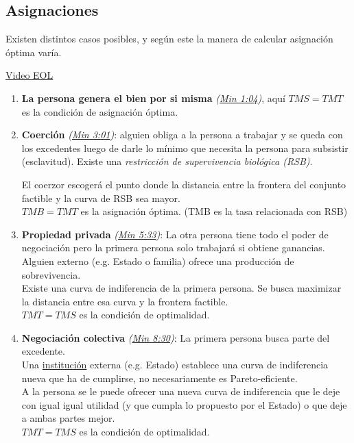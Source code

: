 \subsection{Asignaciones}
Existen distintos casos posibles, y según este la manera de calcular asignación óptima varía.


\href{https://www.youtube.com/watch?v=jWcbHlTCPnQ}{Video EOL}
\begin{enumerate}[label=\Roman*.]
    \item \textbf{La persona genera el bien por si misma} \textit{(\href{https://youtu.be/jWcbHlTCPnQ?t=64}{Min 1:04})}, aquí $TMS = TMT$ es la condición de asignación óptima. 
    
    \item \textbf{Coerción} \textit{(\href{https://youtu.be/jWcbHlTCPnQ?t=181}{Min 3:01})}: alguien obliga a la persona a trabajar y se queda con los excedentes luego de darle lo mínimo que necesita la persona para subsistir (esclavitud). Existe una \textit{restricción de supervivencia biológica (RSB)}.
    
    El coerzor escogerá el punto donde la distancia entre la frontera del conjunto factible y la curva de RSB sea mayor.\\
    
    $TMB = TMT$ es la asignación óptima. (TMB es la tasa relacionada con RSB)
    
    \item \textbf{Propiedad privada} \textit{(\href{https://youtu.be/jWcbHlTCPnQ?t=333}{Min 5:33})}: La otra persona tiene todo el poder de negociación pero la primera persona solo trabajará si obtiene ganancias. \\
    
    Alguien externo (e.g. Estado o familia) ofrece una producción de sobrevivencia.\\
    
    Existe una curva de indiferencia de la primera persona. Se busca maximizar la distancia entre esa curva y la frontera factible.\\
    
    $TMT = TMS$ es la condición de optimalidad.
    
    \item \textbf{Negociación colectiva} \textit{(\href{https://youtu.be/jWcbHlTCPnQ?t=510}{Min 8:30})}: La primera persona busca parte del excedente.\\
    
    Una \hyperlink{institucion}{institución} externa (e.g. Estado) establece una curva de indiferencia nueva que ha de cumplirse, no necesariamente es Pareto-eficiente.\\
    
    A la persona se le puede ofrecer una nueva curva de indiferencia que le deje con igual igual utilidad (y que cumpla lo propuesto por el Estado) o que deje a ambas partes mejor.\\
    
    $TMT = TMS$ es la condición de optimalidad.
\end{enumerate}

